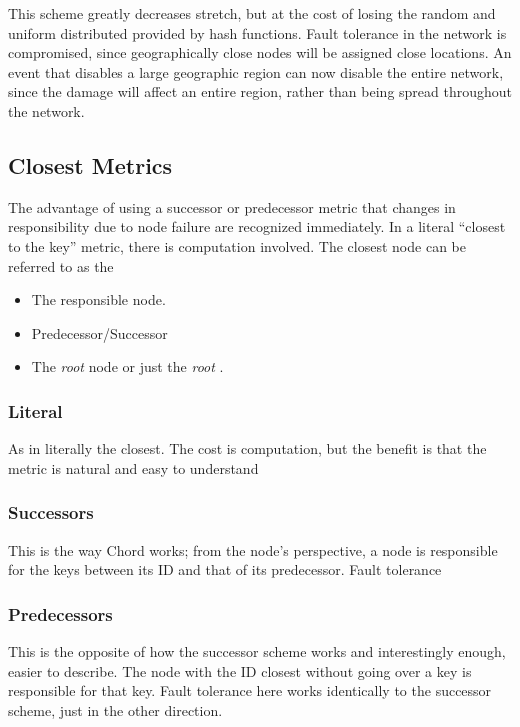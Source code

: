 \documentclass[10pt,letterpaper]{report}
\begin{document}
This scheme greatly decreases stretch, but at the cost of losing the random and uniform distributed provided by hash functions.  
Fault tolerance in the network is compromised, since geographically close nodes will be assigned close locations. 
An event that disables a large geographic region can now disable the entire network, since the damage will affect an entire region, rather than being spread throughout the network.

\subsection{Closest Metrics}

The advantage of using a successor or predecessor metric that changes in responsibility due to node failure are recognized immediately.  
In a literal ``closest to the key'' metric, there is computation involved. The closest node can be referred to as the 

\begin{itemize}
	\item The responsible node.
	\item Predecessor/Successor \cite{chord}
	\item The \textit{root} node or just the \textit{root} \cite{tapestry}.

\end{itemize}

\subsubsection{Literal}
As in literally the closest.  The cost is computation, but the benefit is that the metric is natural and easy to understand

\subsubsection{Successors}
This is the way Chord works;  from the node's perspective, a node is responsible for the keys between its ID and that of its predecessor.   Fault tolerance

\subsubsection{Predecessors}
This is the opposite of how the successor scheme works and interestingly enough, easier to describe.  The node with the ID closest without going over a key is responsible for that key.  Fault tolerance here works identically to the successor scheme, just in the other direction.
\end{document}
